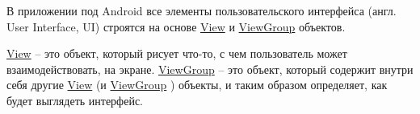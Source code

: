 \newcommand{\View}{
  \href{https://developer.android.com/reference/android/view/View.html}{View}
}

\newcommand{\ViewGroup}{
  \href{https://developer.android.com/reference/android/view/ViewGroup.html}{ViewGroup}
}



В приложении под Android все элементы пользовательского интерфейса
(англ. User Interface, UI) строятся на основе \View и \ViewGroup объектов.
\View -- это объект, который рисует что-то, с чем пользователь может
взаимодействовать, на экране. \ViewGroup -- это объект, который содержит внутри
себя другие \View (и \ViewGroup) объекты, и таким образом определяет, как будет
выглядеть интерфейс.
